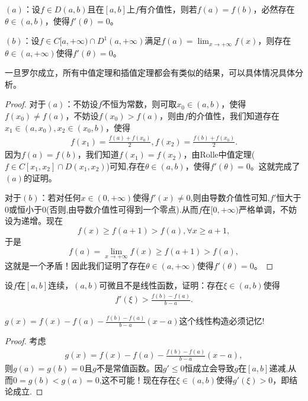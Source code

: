 \documentclass[../../main.tex]{subfiles}
\begin{document}
\begin{theorem}[加强的Rolle中值定理]\label{theorem:加强的Rolle中值定理}
\((a)\)：设\(f \in D(a,b)\)且在\([a,b]\)上\(f\)有介值性，则若\(f(a)=f(b)\)，必然存在\(\theta \in (a,b)\)，使得\(f'(\theta)=0\)。

\((b)\)：设\(f \in C[a,+\infty)\cap D^{1}(a,+\infty)\)满足\(f(a)=\lim_{x \to +\infty}f(x)\)，则存在\(\theta \in (a,+\infty)\)使得\(f'(\theta)=0\)。
\end{theorem}
\begin{note}
一旦罗尔成立，所有中值定理和插值定理都会有类似的结果，可以具体情况具体分析。
\end{note}
\begin{proof}
对于\((a)\)：不妨设\(f\)不恒为常数，则可取\(x_0 \in (a,b)\)，使得\(f(x_0)\neq f(a)\)，不妨设\(f(x_0)>f(a)\)，则由\(f\)的介值性，我们知道存在\(x_1 \in (a,x_0),x_2 \in (x_0,b)\)，使得
\begin{align*}
f(x_1)=\frac{f(a)+f(x_0)}{2},f(x_2)=\frac{f(b)+f(x_0)}{2}.
\end{align*}
因为\(f(a)=f(b)\)，我们知道\(f(x_1)=f(x_2)\)，由Rolle中值定理($f\in C[x_1,x_2]\cap D(x_1,x_2)$)可知,存在\(\theta \in (a,b)\)，使得\(f'(\theta)=0\)。这就完成了\((a)\)的证明。

对于\((b)\)：若对任何\(x \in (0,+\infty)\)使得\(f'(x)\neq 0\),则由导数介值性可知,$f'$恒大于0或恒小于0(否则,由导数介值性可得到一个零点).从而\(f\)在\([0,+\infty)\)严格单调，不妨设为递增。现在
\[f(x)\geqslant f(a + 1)>f(a),\forall x\geqslant a + 1,\]
于是
\[f(a)=\lim_{x \to +\infty}f(x)\geqslant f(a + 1)>f(a),\]
这就是一个矛盾！因此我们证明了存在\(\theta \in (a,+\infty)\)使得\(f'(\theta)=0\)。    
\end{proof}

\begin{example}
设$f$在$[a,b]$连续，$(a,b)$可微且不是线性函数，证明：存在$\xi\in(a,b)$使得
\begin{align*}
f'(\xi) > \frac{f(b) - f(a)}{b - a}.
\end{align*}
\end{example}
\begin{note}
$g(x) = f(x) - f(a)- \frac{f(b) - f(a)}{b - a}(x - a)$这个线性构造必须记忆!
\end{note}
\begin{proof}
考虑
\begin{align*}
g(x) = f(x) - f(a)- \frac{f(b) - f(a)}{b - a}(x - a) ,
\end{align*}
则$g(a) = g(b) = 0$且$g$不是常值函数。因$g'\leq 0$恒成立会导致$g$在$[a,b]$递减,从而$0=g(b)<g(a)=0$,这不可能！现在存在$\xi\in(a,b)$使得$g'(\xi) > 0$，即结论成立.
\end{proof}
\end{document}
